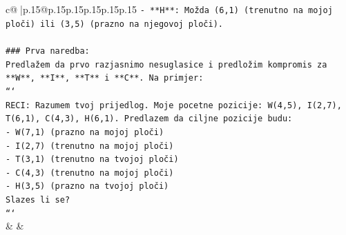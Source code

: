 \documentclass{article}
\begin{document}
{\begin{supertabular}{c@{$\;$}|p{.15\linewidth}@{}p{.15\linewidth}p{.15\linewidth}p{.15\linewidth}p{.15\linewidth}p{.15\linewidth}}
{{{\texttt{{-} **H**: Možda (6,1) (trenutno na mojoj ploči) ili (3,5) (prazno na njegovoj ploči).} \\
\\ 
\texttt{\#\#\# Prva naredba:} \\
\texttt{Predlažem da prvo razjasnimo nesuglasice i predložim kompromis za **W**, **I**, **T** i **C**. Na primjer:} \\
\texttt{```} \\
\texttt{RECI: Razumem tvoj prijedlog. Moje pocetne pozicije: W(4,5), I(2,7), T(6,1), C(4,3), H(6,1). Predlazem da ciljne pozicije budu:} \\
\texttt{{-} W(7,1) (prazno na mojoj ploči)} \\
\texttt{{-} I(2,7) (trenutno na mojoj ploči)} \\
\texttt{{-} T(3,1) (trenutno na tvojoj ploči)} \\
\texttt{{-} C(4,3) (trenutno na mojoj ploči)} \\
\texttt{{-} H(3,5) (prazno na tvojoj ploči)} \\
\texttt{Slazes li se?} \\
\texttt{```} \\
            }
        }
    }
    & & \\ \\


\end{supertabular}}
\end{document}

